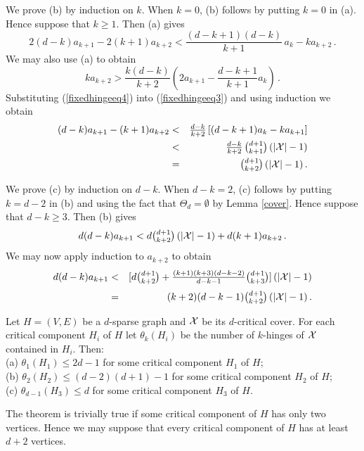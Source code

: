 \documentclass[11pt]{article}
\begin{document}
\fi


We prove (b) by induction on $k$. When $k=0$, (b) follows by putting
$k=0$ in (a). Hence suppose that $k\geq 1$. Then (a) gives
\begin{equation}\label{fixedhingeeq3}
2(d-k)a_{k+1}-2(k+1)a_{k+2}<\frac{(d-k+1)(d-k)}{k+1}\,a_k-ka_{k+2}\,.
\end{equation}
We may also use (a) to obtain
\begin{equation}\label{fixedhingeeq4}
ka_{k+2}>\frac{k(d-k)}{k+2}\left(2a_{k+1}-\frac{d-k+1}{k+1}a_{k}\right)\,.
\end{equation}
Substituting (\ref{fixedhingeeq4}) into (\ref{fixedhingeeq3}) and
using induction we obtain
\begin{eqnarray*}
(d-k)a_{k+1}-(k+1)a_{k+2}&<&\mbox{$\frac{d-k}{k+2}\,[(d-k+1)a_k-ka_{k+1}]$}\\
&<&\mbox{$\frac{d-k}{k+2}\,{{d+1}\choose{k+1}}\,(|{\cal X}|-1)$}\\
&=&\mbox{${{d+1}\choose{k+2}}\,(|{\cal X}|-1)$}\,.
\end{eqnarray*}

We prove (c) by induction on $d-k$. When $d-k=2$, (c) follows by
putting $k=d-2$ in (b)  and using the fact that $\Theta_d=\emptyset$
by Lemma \ref{cover}. Hence suppose that $d-k\geq 3$. Then (b) gives
$$
d(d-k)a_{k+1}<\mbox{$d{{d+1}\choose{k+2}}\,(|{\cal X}|-1)+d(k+1)a_{k+2}$}\,.
$$
We may now apply induction to $a_{k+2}$ to obtain
\begin{eqnarray*}
d(d-k)a_{k+1}&<&\mbox{$[d{{d+1}\choose{k+2}}+\frac{(k+1)(k+3)(d-k-2)}{d-k-1}{{d+1}\choose{k+3}}]
\,(|{\cal X}|-1)$}\\[1mm]
&=&\mbox{$(k+2)(d-k-1){{d+1}\choose{k+2}} \,(|{\cal X}|-1)$}\,.
\end{eqnarray*}
\eproof


\begin{theorem}\label{boundedhinges}
Let $H=(V,E)$ be a $d$-sparse graph and $\cal X$ be its $d$-critical
cover. For each critical component $H_i$ of $H$ let $\theta_k(H_i)$
be the number of $k$-hinges of ${\cal X}$ contained in $H_i$.
Then:\\[1mm]
(a) $\theta_{1}(H_1)\leq 2d-1$ for some critical component $H_1$ of
$H$;
\\[1mm]
(b) $\theta_{2}(H_2)\leq (d-2)(d+1)-1$ for some critical component
$H_2$ of $H$;
\\[1mm]
(c) $\theta_{d-1}(H_3)\leq d$ for some critical component $H_3$ of
$H$.
\end{theorem}
\bproof The theorem is trivially true if some critical component of
$H$ has only two vertices. Hence we may suppose that every critical
component of $H$ has at least $d+2$ vertices.
\end{document}
